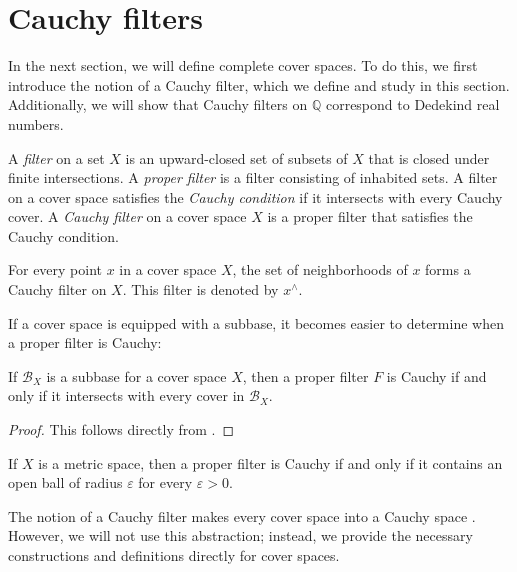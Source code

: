 \documentclass[reqno]{amsart}
\theoremstyle{definition}
\theoremstyle{remark}
\numberwithin{figure}{section}
\begin{document}
\section{Cauchy filters}
\label{sec:filters}

In the next section, we will define complete cover spaces.
To do this, we first introduce the notion of a Cauchy filter, which we define and study in this section.  
Additionally, we will show that Cauchy filters on $\mathbb{Q}$ correspond to Dedekind real numbers.  

\begin{defn}
A \emph{filter} on a set $X$ is an upward-closed set of subsets of $X$ that is closed under finite intersections.  
A \emph{proper filter} is a filter consisting of inhabited sets.
A filter on a cover space satisfies the \emph{Cauchy condition} if it intersects with every Cauchy cover.
A \emph{Cauchy filter} on a cover space $X$ is a proper filter that satisfies the Cauchy condition.
\end{defn}

\begin{example}
For every point $x$ in a cover space $X$, the set of neighborhoods of $x$ forms a Cauchy filter on $X$.  
This filter is denoted by $x^\wedge$.  
\end{example}

If a cover space is equipped with a subbase, it becomes easier to determine when a proper filter is Cauchy:  

\begin{prop}
If $\mathcal{B}_X$ is a subbase for a cover space $X$, then a proper filter $F$ is Cauchy if and only if it intersects with every cover in $\mathcal{B}_X$.  
\end{prop}
\begin{proof}
This follows directly from .  
\end{proof}

\begin{cor}
If $X$ is a metric space, then a proper filter is Cauchy if and only if it contains an open ball of radius $\varepsilon$ for every $\varepsilon > 0$.  
\end{cor}

The notion of a Cauchy filter makes every cover space into a Cauchy space \cite[Definition~1.3.1]{cauchy-spaces}.
However, we will not use this abstraction; instead, we provide the necessary constructions and definitions directly for cover spaces.  
\end{document}

